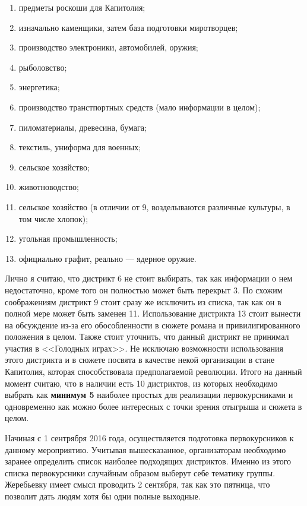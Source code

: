 \documentclass[a4paper, 12pt]{extarticle}
\begin{document}
\begin{enumerate}
\item предметы роскоши для Капитолия;
\item изначально каменщики, затем база подготовки миротворцев;
\item производство электроники, автомобилей, оружия;
\item рыболовство;
\item энергетика;
\item производство транстпортных средств (мало информации в целом);
\item пиломатериалы, древесина, бумага;
\item текстиль, униформа для военных;
\item сельское хозяйство;
\item животноводство;
\item сельское хозяйство (в отличии от 9, возделываются различные культуры, в том числе хлопок);
\item угольная промышленность;
\item официально графит, реально --- ядерное оружие.
\end{enumerate}

\par Лично я считаю, что дистрикт 6 не стоит выбирать, так как информации о нем недостаточно, кроме того он полностью может быть перекрыт 3. По схожим соображениям дистрикт 9 стоит сразу же исключить из списка, так как он в полной мере может быть заменен 11. Использование дистрикта 13 стоит вынести на обсуждение из-за его обособленности в сюжете романа и привилигированного положения в целом. Также стоит уточнить, что данный дистрикт не принимал участия в <<Голодных играх>>. Не исключаю возможности использования этого дистрикта и в сюжете посвята в качестве некой организации в стане Капитолия, которая способствовала предполагаемой революции. Итого на данный момент считаю, что в наличии есть 10 дистриктов, из которых необходимо выбрать как \textbf{минимум 5} наиболее простых для реализации первокурсниками и одновременно как можно более интересных с точки зрения отыгрыша и сюжета в целом.

\par Начиная с 1 сентрября 2016 года, осуществляется подготовка первокурсников к данному мероприятию. Учитывая вышесказанное, организаторам необходимо заранее определить список наиболее подходящих дистриктов. Именно из этого списка первокурсники случайным образом выберут себе тематику группы. Жеребьевку имеет смысл проводить 2 сентября, так как это пятница, что позволит дать людям хотя бы одни полные выходные.
\end{document}
